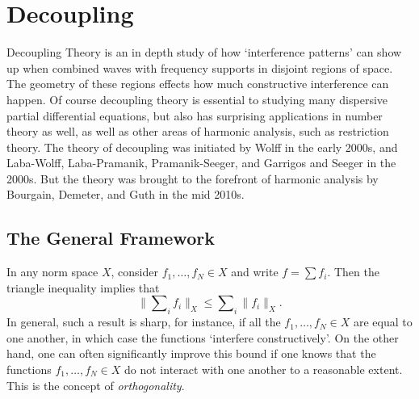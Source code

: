 
\part{Decoupling}

Decoupling Theory is an in depth study of how `interference patterns' can show up when combined waves with frequency supports in disjoint regions of space. The geometry of these regions effects how much constructive interference can happen. Of course decoupling theory is essential to studying many dispersive partial differential equations, but also has surprising applications in number theory as well, as well as other areas of harmonic analysis, such as restriction theory. The theory of decoupling was initiated by Wolff in the early 2000s, and Laba-Wolff, Laba-Pramanik, Pramanik-Seeger, and Garrigos and Seeger in the 2000s. But the theory was brought to the forefront of harmonic analysis by Bourgain, Demeter, and Guth in the mid 2010s.








\chapter{The General Framework}

In any norm space $X$, consider $f_1,\dots, f_N \in X$ and write $f = \sum f_i$. Then the triangle inequality implies that
%
\[ \| \sum\nolimits_i f_i \|_X \leq \sum\nolimits_i \| f_i \|_X. \]
%
In general, such a result is sharp, for instance, if all the $f_1,\dots, f_N \in X$ are equal to one another, in which case the functions `interfere constructively'. On the other hand, one can often significantly improve this bound if one knows that the functions $f_1,\dots,f_N \in X$ do not interact with one another to a reasonable extent. This is the concept of \emph{orthogonality}.

